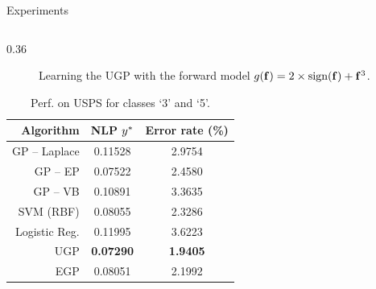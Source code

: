 \documentclass[final]{beamer}
\newlength{\twocolwid}
\begin{document}
\begin{frame}[t]
\begin{columns}[t]
\begin{column}{\twocolwid}
\begin{columns}[t,totalwidth=\twocolwid]
\begin{column}{\twocolwid}
\begin{block}{Experiments}
\begin{columns}
\begin{column}{0.36\twocolwid}
\begin{figure}
    \caption[]{
   Learning the UGP with the forward model $g\!\left({{\mathbf{f}}}\right) =
     2\times\text{sign}\!\left({\mathbf{f}}\right) + \mathbf{f}^3$.    
       }
   \label{fig:sign}
\end{figure}

\vspace{-4mm}

\vspace{-2mm}
\begin{table}[tb]
    \centering

    \caption[]{
     Perf. on USPS  for classes `3' and `5'.
    }

    \vspace{5mm}
    \small
    \begin{tabular}{r| c c}
    Algorithm & NLP $y^{*}$ & Error rate (\%) \\
    \toprule
    GP -- Laplace & 0.11528 & 2.9754  \\
    GP -- EP & 0.07522 & 2.4580  \\
    GP -- VB & 0.10891 & 3.3635  \\ 
    SVM (RBF) & 0.08055 & 2.3286  \\
    Logistic Reg. & 0.11995 & 3.6223  \\
    \midrule
    UGP & \textbf{0.07290} & \textbf{1.9405}  \\
    EGP & 0.08051 & 2.1992  \\
    \bottomrule
    \end{tabular}
    \label{tab:class}
\end{table}




\end{column}
\end{columns}
\end{block}
\end{column}
\end{columns}
\end{column}
\end{columns}
\end{frame}
\end{document}
